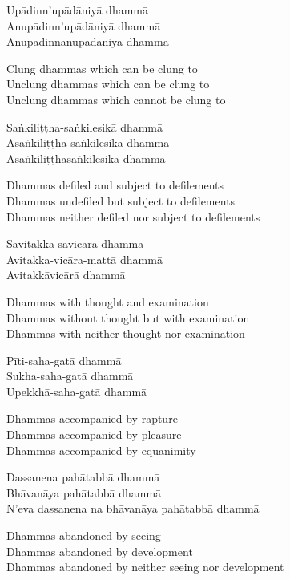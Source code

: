 Upādinn'upādāniyā dhammā\\
Anupādinn'upādāniyā dhammā\\
Anupādinnānupādāniyā dhammā

\begin{english-verses}
  Clung dhammas which can be clung to\\
  Unclung dhammas which can be clung to\\
  Unclung dhammas which cannot be clung to
\end{english-verses}

Saṅkiliṭṭha-saṅkilesikā dhammā\\
Asaṅkiliṭṭha-saṅkilesikā dhammā\\
Asaṅkiliṭṭhāsaṅkilesikā dhammā

\begin{english-verses}
  Dhammas defiled and subject to defilements\\
  Dhammas undefiled but subject to defilements\\
  Dhammas neither defiled nor subject to defilements
\end{english-verses}

Savitakka-savicārā dhammā\\
Avitakka-vicāra-mattā dhammā\\
Avitakkāvicārā dhammā

\begin{english-verses}
  Dhammas with thought and examination\\
  Dhammas without thought but with examination\\
  Dhammas with neither thought nor examination
\end{english-verses}

Pīti-saha-gatā dhammā\\
Sukha-saha-gatā dhammā\\
Upekkhā-saha-gatā dhammā

\begin{english-verses}
  Dhammas accompanied by rapture\\
  Dhammas accompanied by pleasure\\
  Dhammas accompanied by equanimity
\end{english-verses}

Dassanena pahātabbā dhammā\\
Bhāvanāya pahātabbā dhammā\\
N'eva dassanena na bhāvanāya pahātabbā dhammā

\begin{english-verses}
  Dhammas abandoned by seeing\\
  Dhammas abandoned by development\\
  Dhammas abandoned by neither seeing nor development
\end{english-verses}

